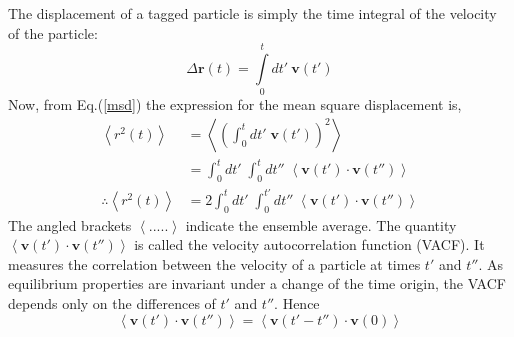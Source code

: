     The displacement of  a tagged particle  is simply the time integral of the velocity of the particle:
    \begin{equation}
    \label{msd}
    \Delta \mathbf{r}(t) = \int\limits_{0}^{t} dt'~\mathbf{v}(t')  
    \end{equation}
    Now, from Eq.(\ref{msd})  the expression for the mean square displacement is,
    \begin{align}
       \left\langle r^2(t) \right\rangle &= \left\langle \left(\int_0^t dt'\;\mathbf{v}(t')\right)^2 \right\rangle \nonumber\\
       & =\int_0^t dt'\; \int_0^t dt''\;\left\langle \mathbf{v}(t')\cdot \mathbf{v}(t'') \right\rangle\nonumber\\
 \therefore  \left\langle r^2(t) \right\rangle     & =2 \int_0^t dt'\; \int_0^{t'} dt''\;\left\langle \mathbf{v}(t')\cdot \mathbf{v}(t'') \right\rangle 
 \label{vacf}
       \end{align}
   The angled brackets $\left\langle ..... \right\rangle $ indicate the ensemble average. The quantity
      $\left\langle\mathbf{v}(t')\cdot\mathbf{v}(t'')\right\rangle$ is called the velocity autocorrelation function (VACF). It measures the correlation between the velocity of a particle at times $t'$ and $t''$. As equilibrium properties are invariant under a change of the time origin, the VACF depends only on the differences of $t'$ and $t''$. Hence 
   \begin{equation}
   \left\langle \mathbf{v}(t')\cdot \mathbf{v}(t'') \right\rangle = \left\langle \mathbf{v}(t'-t'')\cdot \mathbf{v}(0) \right\rangle \nonumber
   \end{equation}
   
